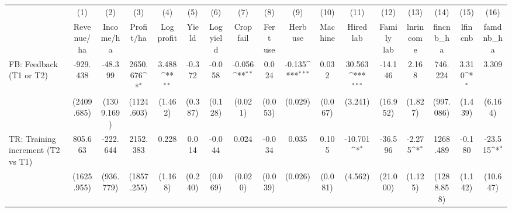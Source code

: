 {
\def\sym#1{\ifmmode^{#1}\else\(^{#1}\)\fi}
\begin{tabular}{l*{16}{c}}
\toprule
                    &\multicolumn{1}{c}{(1)}&\multicolumn{1}{c}{(2)}&\multicolumn{1}{c}{(3)}&\multicolumn{1}{c}{(4)}&\multicolumn{1}{c}{(5)}&\multicolumn{1}{c}{(6)}&\multicolumn{1}{c}{(7)}&\multicolumn{1}{c}{(8)}&\multicolumn{1}{c}{(9)}&\multicolumn{1}{c}{(10)}&\multicolumn{1}{c}{(11)}&\multicolumn{1}{c}{(12)}&\multicolumn{1}{c}{(13)}&\multicolumn{1}{c}{(14)}&\multicolumn{1}{c}{(15)}&\multicolumn{1}{c}{(16)}\\
                    &\multicolumn{1}{c}{Revenue/ha}&\multicolumn{1}{c}{Income/ha}&\multicolumn{1}{c}{Profit/ha}&\multicolumn{1}{c}{Log profit}&\multicolumn{1}{c}{Yield}&\multicolumn{1}{c}{Log yield}&\multicolumn{1}{c}{Crop fail}&\multicolumn{1}{c}{Fert use}&\multicolumn{1}{c}{Herb use}&\multicolumn{1}{c}{Machine}&\multicolumn{1}{c}{Hired lab}&\multicolumn{1}{c}{Family lab}&\multicolumn{1}{c}{lnrincome}&\multicolumn{1}{c}{fincnb\_ha}&\multicolumn{1}{c}{lfincnb}&\multicolumn{1}{c}{famdnb\_ha}\\
\midrule
FB: Feedback (T1 or T2)&    -929.438         &     -48.399         &    2650.676\sym{*}  &       3.488\sym{**} &      -0.372         &      -0.058         &      -0.056\sym{**} &       0.024         &      -0.135\sym{***}&       0.032         &      30.563\sym{***}&     -14.146         &       2.168         &     746.224         &       3.310\sym{*}  &       3.309         \\
                    &  (2409.685)         &  (1309.169)         &  (1124.603)         &     (1.462)         &     (0.387)         &     (0.128)         &     (0.021)         &     (0.053)         &     (0.029)         &     (0.067)         &     (3.241)         &    (16.952)         &     (1.827)         &   (997.086)         &     (1.439)         &     (6.164)         \\
TR: Training increment (T2 vs T1)&     805.663         &    -222.644         &    2152.383         &       0.228         &       0.014         &      -0.044         &       0.024         &      -0.034         &       0.035         &       0.105         &     -10.701\sym{*}  &     -36.596         &      -2.275\sym{*}  &    1268.489         &      -0.180         &     -23.515\sym{*}  \\
                    &  (1625.955)         &   (936.779)         &  (1857.255)         &     (1.168)         &     (0.240)         &     (0.069)         &     (0.020)         &     (0.039)         &     (0.026)         &     (0.081)         &     (4.562)         &    (21.000)         &     (1.125)         &  (1288.858)         &     (1.142)         &    (10.647)         \\

\end{tabular}}
